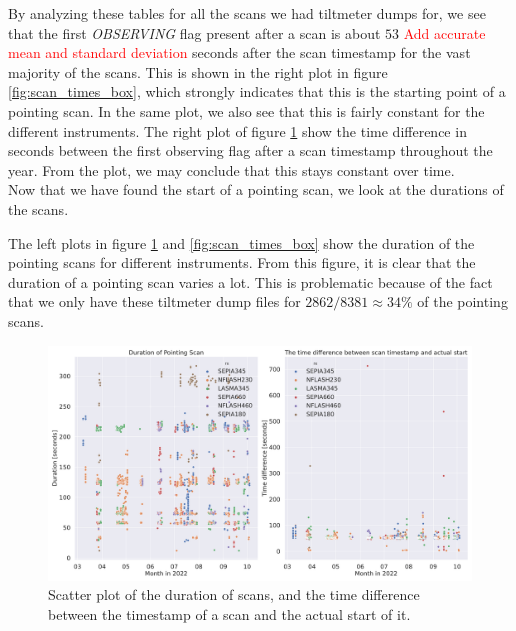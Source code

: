 By analyzing these tables for all the scans we had tiltmeter dumps for,
we see that the first \textit{OBSERVING} flag present after a scan is about $53$ \textcolor{red}{Add accurate mean and standard deviation} seconds after the scan timestamp for the vast majority of the scans.
This is shown in the right plot in figure \ref{fig:scan_times_box}, which strongly indicates that this is the starting point of a pointing scan.
In the same plot, we also see that this is fairly constant for the different instruments.
The right plot of figure \ref{fig:scan_times_date} show the time difference in seconds between the first observing flag after a scan timestamp throughout the year.
From the plot, we may conclude that this stays constant over time.\\

Now that we have found the start of a pointing scan, we look at the durations of the scans.

The left plots in figure \ref{fig:scan_times_date} and \ref{fig:scan_times_box} show the duration of the pointing scans for different instruments.
From this figure, it is clear that the duration of a pointing scan varies a lot.
This is problematic because of the fact that we only have these tiltmeter dump files for $2862/8381\approx 34\%$ of the pointing scans.


\begin{figure}[H]
    \centering
    \includegraphics[width=1.1\textwidth]{Tiltmeter plots/scan_duration_distribution_date.pdf}
    \caption{Scatter plot of the duration of scans, and the time difference between the timestamp of a scan and the actual start of it.}
    \label{fig:scan_times_date}
\end{figure}

